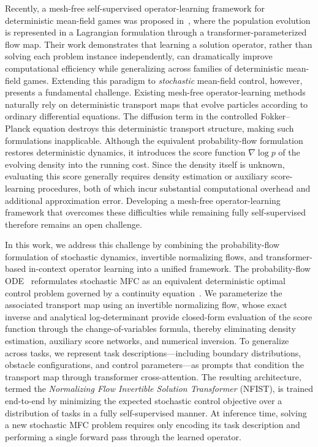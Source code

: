 \documentclass[preprint]{elsarticle}
\begin{document}
Recently, a mesh-free self-supervised operator-learning framework for deterministic mean-field games was proposed in~\cite{huang2025unsupervised}, where the population evolution is represented in a Lagrangian formulation through a transformer-parameterized flow map. Their work demonstrates that learning a solution operator, rather than solving each problem instance independently, can dramatically improve computational efficiency while generalizing across families of deterministic mean-field games. Extending this paradigm to \emph{stochastic} mean-field control, however, presents a fundamental challenge. Existing mesh-free operator-learning methods naturally rely on deterministic transport maps that evolve particles according to ordinary differential equations. The diffusion term in the controlled Fokker--Planck equation destroys this deterministic transport structure, making such formulations inapplicable. Although the equivalent probability-flow formulation restores deterministic dynamics, it introduces the score function $\nabla\log p$ of the evolving density into the running cost. Since the density itself is unknown, evaluating this score generally requires density estimation or auxiliary score-learning procedures, both of which incur substantial computational overhead and additional approximation error. Developing a mesh-free operator-learning framework that overcomes these difficulties while remaining fully self-supervised therefore remains an open challenge.

In this work, we address this challenge by combining the probability-flow formulation of stochastic dynamics, invertible normalizing flows, and transformer-based in-context operator learning into a unified framework. The probability-flow ODE~\cite{anderson1982reverse,song2021score,boffi2023probability} reformulates stochastic MFC as an equivalent deterministic optimal control problem governed by a continuity equation~\cite{zhou2025score}. We parameterize the associated transport map using an invertible normalizing flow, whose exact inverse and analytical log-determinant provide closed-form evaluation of the score function through the change-of-variables formula, thereby eliminating density estimation, auxiliary score networks, and numerical inversion. To generalize across tasks, we represent task descriptions—including boundary distributions, obstacle configurations, and control parameters—as prompts that condition the transport map through transformer cross-attention. The resulting architecture, termed the \emph{Normalizing Flow Invertible Solution Transformer} (NFIST), is trained end-to-end by minimizing the expected stochastic control objective over a distribution of tasks in a fully self-supervised manner. At inference time, solving a new stochastic MFC problem requires only encoding its task description and performing a single forward pass through the learned operator.
\end{document}
